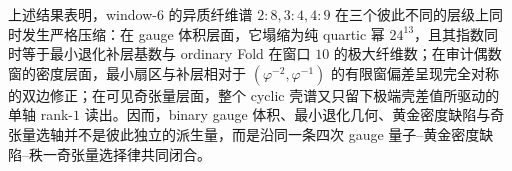 \noindent
上述结果表明，window-\(6\) 的异质纤维谱 \(2{:}8,3{:}4,4{:}9\) 在三个彼此不同的层级上同时发生严格压缩：在 gauge 体积层面，它塌缩为纯 quartic 幂 \(24^{13}\)，且其指数同时等于最小退化补层基数与 ordinary Fold 在窗口 \(10\) 的极大纤维数；在审计偶数窗的密度层面，最小扇区与补层相对于 \((\varphi^{-2},\varphi^{-1})\) 的有限窗偏差呈现完全对称的双边修正；在可见奇张量层面，整个 cyclic 壳谱又只留下极端壳差值所驱动的单轴 rank-\(1\) 读出。因而，binary gauge 体积、最小退化几何、黄金密度缺陷与奇张量选轴并不是彼此独立的派生量，而是沿同一条四次 gauge 量子--黄金密度缺陷--秩一奇张量选择律共同闭合。

\endinput
